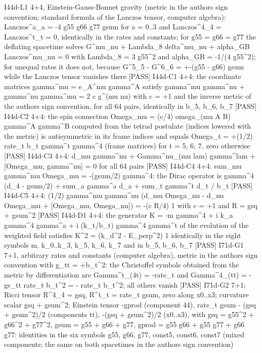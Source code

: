 \documentclass[
  10pt,
]{article}
\newenvironment{Shaded}{}{}
\newcommand{\NormalTok}[1]{#1}
\begin{document}
\begin{Shaded}
\begin{Highlighting}[]
\NormalTok{[PASS] I44d{-}L1  4+4, Einstein{-}Gauss{-}Bonnet gravity (metric in the author\textquotesingle{}s sign convention; standard formula of the Lanczos tensor, computer algebra): Lanczos\^{}a\_a = {-}4 g55 g66 g77 gsum for a = 0..3 and Lanczos\^{}4\_4 = Lanczos\^{}t\_t = 0, identically in the rates and constants; for g55 = g66 = g77 the deflating spacetime solves G\^{}mu\_nu + Lambda\_8 delta\^{}mu\_nu + alpha\_GB Lanczos\^{}mu\_nu = 0 with Lambda\_8 = 3 g55\^{}2 and alpha\_GB = {-}1/(4 g55\^{}2); for unequal rates it does not, because G\^{}5\_5 {-} G\^{}6\_6 = +{-}(g55 {-} g66) gsum while the Lanczos tensor vanishes there}
\NormalTok{[PASS] I44d{-}C1  4+4: the coordinate matrices gamma\^{}mu = e\_A\^{}mu gamma\^{}A satisfy gamma\^{}mu gamma\^{}nu + gamma\^{}nu gamma\^{}mu = 2 c g\^{}(mu nu) with c = +1 and the inverse metric of the author\textquotesingle{}s sign convention, for all 64 pairs, identically in b\_5, b\_6, b\_7}
\NormalTok{[PASS] I44d{-}C2  4+4: the spin connection Omega\_mu = (c/4) omega\_(mu A B) gamma\^{}A gamma\^{}B computed from the tetrad postulate (indices lowered with the metric) is antisymmetric in its frame indices and equals Omega\_t = +(1/2) rate\_t b\_t gamma\^{}t gamma\^{}4 (frame matrices) for t = 5, 6, 7, zero otherwise}
\NormalTok{[PASS] I44d{-}C3  4+4: d\_mu gamma\^{}nu + Gamma\^{}nu\_(mu lam) gamma\^{}lam + [Omega\_mu, gamma\^{}nu] = 0 for all 64 pairs}
\NormalTok{[PASS] I44d{-}C4  4+4: sum\_mu gamma\^{}mu Omega\_mu = {-}(gsum/2) gamma\^{}4: the Dirac operator is gamma\^{}4 (d\_4 {-} gsum/2) + sum\_a gamma\^{}a d\_a + sum\_t gamma\^{}t d\_t / b\_t}
\NormalTok{[PASS] I44d{-}C5  4+4: (1/2) gamma\^{}mu gamma\^{}nu (d\_mu Omega\_nu {-} d\_nu Omega\_mu + [Omega\_mu, Omega\_nu]) = {-}(c R/4) 1 with c = +1 and R = gsq + gsum\^{}2}
\NormalTok{[PASS] I44d{-}D1  4+4: the generator K = {-}m gamma\^{}4 + i k\_a gamma\^{}4 gamma\^{}a + i (k\_t/b\_t) gamma\^{}4 gamma\^{}t of the evolution of the weighted field satisfies K\^{}2 = (k\_d\^{}2 {-} E\_perp\^{}2) 1 identically in the eight symbols m, k\_0..k\_3, k\_5, k\_6, k\_7 and in b\_5, b\_6, b\_7}
\NormalTok{[PASS] I71d{-}G1  7+1, arbitrary rates and constants (computer algebra), metric in the author\textquotesingle{}s sign convention with g\_tt = +b\_t\^{}2: the Christoffel symbols obtained from the metric by differentiation are Gamma\^{}t\_(4t) = {-}rate\_t and Gamma\^{}4\_(tt) = {-}gs\_tt rate\_t b\_t\^{}2 = {-} rate\_t b\_t\^{}2; all others vanish}
\NormalTok{[PASS] I71d{-}G2  7+1: Ricci tensor R\^{}4\_4 = gsq, R\^{}t\_t = rate\_t gsum, zero along x0..x3; curvature scalar gsq + gsum\^{}2; Einstein tensor {-}gprod (component 44), rate\_t gsum {-} (gsq + gsum\^{}2)/2 (components tt), {-}(gsq + gsum\^{}2)/2 (x0..x3), with gsq = g55\^{}2 + g66\^{}2 + g77\^{}2, gsum = g55 + g66 + g77, gprod = g55 g66 + g55 g77 + g66 g77: identities in the six symbols g55, g66, g77, const5, const6, const7 (mixed components; the same on both spacetimes in the author\textquotesingle{}s sign convention)}

\end{Highlighting}
\end{Shaded}
\end{document}
